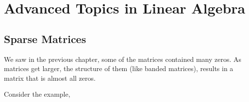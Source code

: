
\chapter{Advanced Topics in Linear Algebra} \label{ch:lin-alg-adv}


\section{Sparse Matrices} 

We saw in the previous chapter, some of the matrices contained many zeros.  As matrices get larger, the structure of them (like banded matrices), results in a matrix that is almost all zeros.  

Consider the example, 